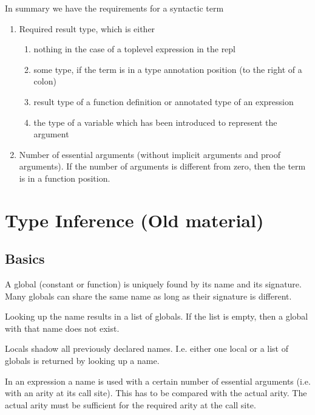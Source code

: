 \noindent In summary we have the requirements for a syntactic term
%
\begin{enumerate}

\item Required result type, which is either
  \begin{enumerate}

  \item nothing in the case of a toplevel expression in the repl

  \item some type, if the term is in a type annotation position (to the right
    of a colon)

  \item result type of a function definition or annotated type of an expression

  \item the type of a variable which has been introduced to represent the
    argument
  \end{enumerate}


\item Number of essential arguments (without implicit arguments and proof
  arguments). If the number of arguments is different from zero, then the term
  is in a function position.
\end{enumerate}







\newpage
\section{Type Inference (Old material)}

\subsection{Basics}

A global (constant or function) is uniquely found by its name and its
signature. Many globals can share the same name as long as their signature is
different.

Looking up the name results in a list of globals. If the list is empty, then a
global with that name does not exist.

Locals shadow all previously declared names. I.e. either one local or a list
of globals is returned by looking up a name.

In an expression a name is used with a certain number of essential arguments
(i.e. with an arity at its call site). This has to be compared with the actual
arity. The actual arity must be sufficient for the required arity at the call
site.

